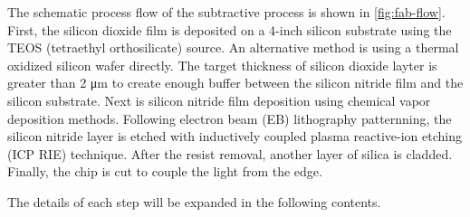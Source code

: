 The schematic process flow of the subtractive process is shown in \autoref{fig:fab-flow}. First, the silicon dioxide film is deposited on a 4-inch silicon substrate using the TEOS  (tetraethyl orthosilicate) source.
An alternative method is using a thermal oxidized silicon wafer directly. The target thickness of silicon dioxide layter is greater than 2 \si{\um} to create enough buffer between the silicon nitride film and the silicon substrate. 
Next is silicon nitride film deposition using chemical vapor deposition methods. Following electron beam (EB) lithography patternning, the silicon nitride layer is etched with inductively coupled plasma reactive-ion etching (ICP RIE) technique. After the resist removal, another layer of silica is cladded. Finally, the chip is cut to couple the light from the edge. 

The details of each step will be expanded in the following contents.


